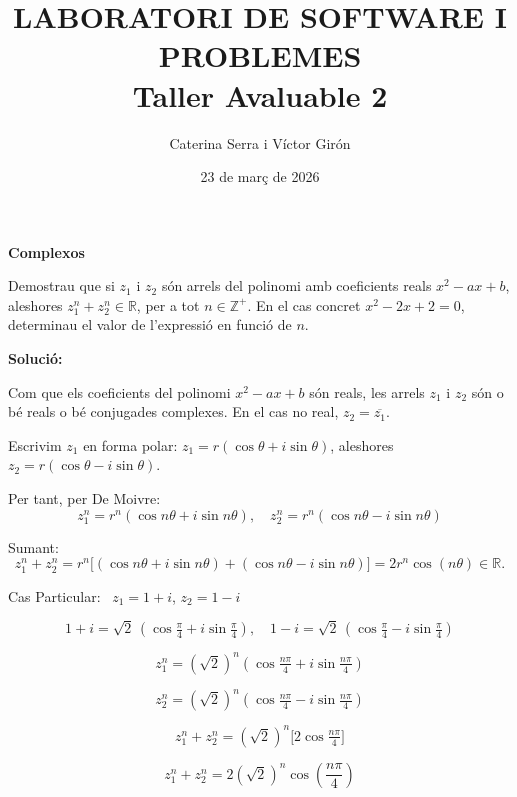 \documentclass{article}
\begin{document}
\title{LABORATORI DE SOFTWARE I PROBLEMES \\ Taller Avaluable 2}
\author{Caterina Serra i Víctor Girón}
\date{23 de març de 2026}
\maketitle
\textbf{Complexos}

Demostrau que si $z_1$ i $z_2$ són arrels del polinomi amb coeficients reals $x^2 - ax + b$, aleshores $z_1^n + z_2^n \in \mathbb{R}$, per a tot $n \in \mathbb{Z}^+$. En el cas concret $x^2 - 2x + 2 = 0$, determinau el valor de l'expressió en funció de $n$.

\textbf{Solució:}

Com que els coeficients del polinomi $x^2 - ax + b$ són reals, les arrels $z_1$ i $z_2$ són o bé reals o bé conjugades complexes. En el cas no real, $z_2 = \overline{z_1}$. 

Escrivim $z_1$ en forma polar: $z_1 = r(\cos\theta + i\sin\theta)$, aleshores $z_2 = r(\cos\theta - i\sin\theta)$. 

Per tant, per De Moivre:
\[
z_1^n = r^n(\cos n\theta + i\sin n\theta), \quad
z_2^n = r^n(\cos n\theta - i\sin n\theta)
\]

Sumant:
\[
z_1^n + z_2^n = r^n\big[(\cos n\theta + i\sin n\theta) + (\cos n\theta - i\sin n\theta)\big] = 2r^n \cos(n\theta) \in \mathbb{R}.
\]
 
 Cas Particular:
~$z_1 = 1 + i$, \quad $z_2 = 1 - i$

\[
1+i = \sqrt{2}\,(\cos\tfrac{\pi}{4} + i\sin\tfrac{\pi}{4}), \quad
1-i = \sqrt{2}\,(\cos\tfrac{\pi}{4} - i\sin\tfrac{\pi}{4})
\]

\[
z_1^n = (\sqrt{2})^n \left(\cos\tfrac{n\pi}{4} + i\sin\tfrac{n\pi}{4}\right)
\]

\[
z_2^n = (\sqrt{2})^n \left(\cos\tfrac{n\pi}{4} - i\sin\tfrac{n\pi}{4}\right)
\]

\[
z_1^n + z_2^n =
(\sqrt{2})^n \Big[2\cos\tfrac{n\pi}{4}\Big]
\]

\[
z_1^n + z_2^n = 2(\sqrt{2})^n \cos\left(\frac{n\pi}{4}\right)
\]
\end{document}
